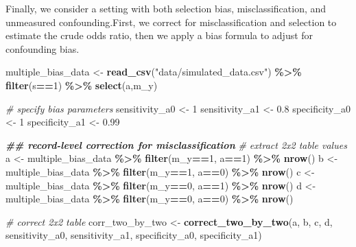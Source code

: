 \documentclass[
]{book}
\newenvironment{Shaded}{\begin{snugshade}}{\end{snugshade}}
\newcommand{\CommentTok}[1]{\textcolor[rgb]{0.56,0.35,0.01}{\textit{#1}}}
\newcommand{\DecValTok}[1]{\textcolor[rgb]{0.00,0.00,0.81}{#1}}
\newcommand{\DocumentationTok}[1]{\textcolor[rgb]{0.56,0.35,0.01}{\textbf{\textit{#1}}}}
\newcommand{\FloatTok}[1]{\textcolor[rgb]{0.00,0.00,0.81}{#1}}
\newcommand{\FunctionTok}[1]{\textcolor[rgb]{0.13,0.29,0.53}{\textbf{#1}}}
\newcommand{\NormalTok}[1]{#1}
\newcommand{\OtherTok}[1]{\textcolor[rgb]{0.56,0.35,0.01}{#1}}
\newcommand{\SpecialCharTok}[1]{\textcolor[rgb]{0.81,0.36,0.00}{\textbf{#1}}}
\newcommand{\StringTok}[1]{\textcolor[rgb]{0.31,0.60,0.02}{#1}}
\begin{document}
Finally, we consider a setting with both selection bias, misclassification, and unmeasured confounding.First, we correct for misclassification and selection to estimate the crude odds ratio, then we apply a bias formula to adjust for confounding bias.

\begin{Shaded}
\begin{Highlighting}[]
\NormalTok{multiple\_bias\_data }\OtherTok{\textless{}{-}} \FunctionTok{read\_csv}\NormalTok{(}\StringTok{"data/simulated\_data.csv"}\NormalTok{) }\SpecialCharTok{\%\textgreater{}\%} \FunctionTok{filter}\NormalTok{(s}\SpecialCharTok{==}\DecValTok{1}\NormalTok{) }\SpecialCharTok{\%\textgreater{}\%} \FunctionTok{select}\NormalTok{(a,m\_y) }

\CommentTok{\# specify bias parameters}
\NormalTok{sensitivity\_a0 }\OtherTok{\textless{}{-}}  \DecValTok{1}
\NormalTok{sensitivity\_a1 }\OtherTok{\textless{}{-}} \FloatTok{0.8}
\NormalTok{specificity\_a0 }\OtherTok{\textless{}{-}} \DecValTok{1}
\NormalTok{specificity\_a1 }\OtherTok{\textless{}{-}} \FloatTok{0.99}

\DocumentationTok{\#\# record{-}level correction for misclassification}
\CommentTok{\# extract 2x2 table values}
\NormalTok{a }\OtherTok{\textless{}{-}}\NormalTok{ multiple\_bias\_data }\SpecialCharTok{\%\textgreater{}\%} \FunctionTok{filter}\NormalTok{(m\_y}\SpecialCharTok{==}\DecValTok{1}\NormalTok{, a}\SpecialCharTok{==}\DecValTok{1}\NormalTok{) }\SpecialCharTok{\%\textgreater{}\%} \FunctionTok{nrow}\NormalTok{()}
\NormalTok{b }\OtherTok{\textless{}{-}}\NormalTok{ multiple\_bias\_data }\SpecialCharTok{\%\textgreater{}\%} \FunctionTok{filter}\NormalTok{(m\_y}\SpecialCharTok{==}\DecValTok{1}\NormalTok{, a}\SpecialCharTok{==}\DecValTok{0}\NormalTok{) }\SpecialCharTok{\%\textgreater{}\%} \FunctionTok{nrow}\NormalTok{()}
\NormalTok{c }\OtherTok{\textless{}{-}}\NormalTok{ multiple\_bias\_data }\SpecialCharTok{\%\textgreater{}\%} \FunctionTok{filter}\NormalTok{(m\_y}\SpecialCharTok{==}\DecValTok{0}\NormalTok{, a}\SpecialCharTok{==}\DecValTok{1}\NormalTok{) }\SpecialCharTok{\%\textgreater{}\%} \FunctionTok{nrow}\NormalTok{()}
\NormalTok{d }\OtherTok{\textless{}{-}}\NormalTok{ multiple\_bias\_data }\SpecialCharTok{\%\textgreater{}\%} \FunctionTok{filter}\NormalTok{(m\_y}\SpecialCharTok{==}\DecValTok{0}\NormalTok{, a}\SpecialCharTok{==}\DecValTok{0}\NormalTok{) }\SpecialCharTok{\%\textgreater{}\%} \FunctionTok{nrow}\NormalTok{()}

\CommentTok{\# correct 2x2 table }
\NormalTok{corr\_two\_by\_two }\OtherTok{\textless{}{-}} \FunctionTok{correct\_two\_by\_two}\NormalTok{(a, b, c, d, sensitivity\_a0, sensitivity\_a1, specificity\_a0, specificity\_a1)}


\end{Highlighting}
\end{Shaded}
\end{document}
